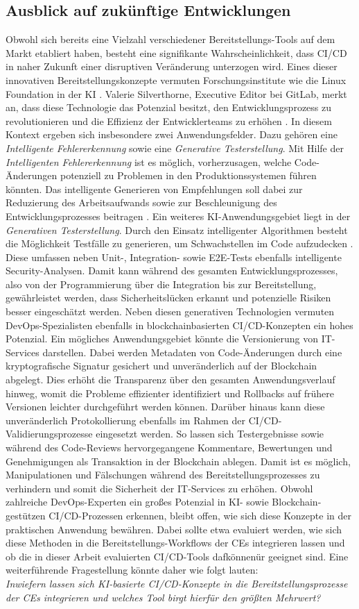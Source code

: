 \subsection{Ausblick auf zukünftige Entwicklungen}

Obwohl sich bereits eine Vielzahl verschiedener Bereitstellungs-Tools auf dem Markt etabliert haben, besteht eine signifikante Wahrscheinlichkeit, dass CI/CD in naher Zukunft einer disruptiven Veränderung unterzogen wird. Eines dieser innovativen Bereitstellungskonzepte vermuten Forschungsinstitute wie die Linux Foundation in der KI \cite{Foundation.2022}. Valerie Silverthorne, Executive Editor bei GitLab, merkt an, dass diese Technologie das Potenzial besitzt, den Entwicklungsprozess zu revolutionieren und die Effizienz der Entwicklerteams zu erhöhen \cite{.20230415}. In diesem Kontext ergeben sich insbesondere zwei Anwendungsfelder. Dazu gehören eine \textit{Intelligente Fehlererkennung} sowie eine \textit{Generative Testerstellung}. Mit Hilfe der \textit{Intelligenten Fehlererkennung} ist es möglich, vorherzusagen, welche Code-Änderungen potenziell zu Problemen in den Produktionssystemen führen könnten. Das intelligente Generieren von Empfehlungen soll dabei zur Reduzierung des Arbeitsaufwands sowie zur Beschleunigung des Entwicklungsprozesses beitragen \cite{.20230419d}. Ein weiteres KI-Anwendungsgebiet liegt in der \textit{Generativen Testerstellung}. Durch den Einsatz intelligenter Algorithmen besteht die Möglichkeit Testfälle zu generieren, um Schwachstellen im Code aufzudecken \cite{Fernandes.20210223}. Diese umfassen neben Unit-, Integration- sowie E2E-Tests ebenfalls intelligente Security-Analysen. Damit kann während des gesamten Entwicklungsprozesses, also von der Programmierung über die Integration bis zur Bereitstellung, gewährleistet werden, dass Sicherheitslücken erkannt und potenzielle Risiken besser eingeschätzt werden. Neben diesen generativen Technologien vermuten DevOps-Spezialisten ebenfalls in blockchainbasierten CI/CD-Konzepten ein hohes Potenzial. Ein mögliches Anwendungsgebiet könnte die Versionierung von IT-Services darstellen. Dabei werden Metadaten von Code-Änderungen durch eine kryptografische Signatur gesichert und unveränderlich auf der Blockchain abgelegt. Dies erhöht die Transparenz über den gesamten Anwendungsverlauf hinweg, womit die Probleme effizienter identifiziert und Rollbacks auf frühere Versionen leichter durchgeführt werden können. Darüber hinaus kann diese unveränderlich Protokollierung ebenfalls im Rahmen der CI/CD-Validierungsprozesse eingesetzt werden. So lassen sich Testergebnisse sowie während des Code-Reviews hervorgegangene Kommentare, Bewertungen und Genehmigungen als Transaktion in der Blockchain ablegen. Damit ist es möglich, Manipulationen und Fälschungen während des Bereitstellungsprozesses zu verhindern und somit die Sicherheit der IT-Services zu erhöhen. Obwohl zahlreiche DevOps-Experten ein großes Potenzial in KI- sowie Blockchain-gestützen CI/CD-Prozessen erkennen, bleibt offen, wie sich diese Konzepte in der praktischen Anwendung bewähren. Dabei sollte etwa evaluiert werden, wie sich diese Methoden in die Bereitstellungs-Workflows der CEs integrieren lassen und ob die in dieser Arbeit evaluierten CI/CD-Tools dafkönnenür geeignet sind. Eine weiterführende Fragestellung könnte daher wie folgt lauten:\\
\textit{Inwiefern lassen sich KI-basierte CI/CD-Konzepte in die Bereitstellungsprozesse der CEs integrieren und welches Tool birgt hierfür den größten Mehrwert?}
